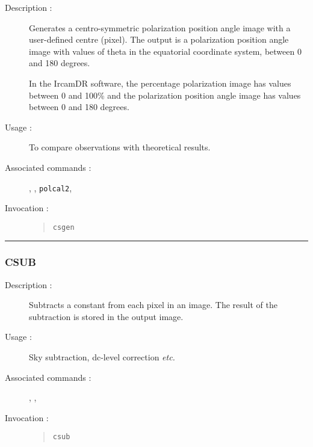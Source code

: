 \begin{description}

\item[Description :] Generates a centro-symmetric polarization position
angle image with a user-defined centre (pixel).  The output is a
polarization position angle image with values of theta in the
equatorial coordinate system, between 0 and 180 degrees.

In the {\sc IrcamDR} software, the percentage polarization image has
values between 0 and 100\% and the polarization position angle image
has values between 0 and 180 degrees.

\item[Usage :] To compare observations with theoretical results.

\item[Associated commands :] {\tt {}}, 
{\tt {}}, {\tt polcal2}, 
{\tt {}}

\item[Invocation :]

\begin{quote}{\tt  csgen }\end{quote}

\end{description}

\hrule 
\subsubsection*{\label{CSUB}CSUB}

\begin{description}

\item[Description :] Subtracts a constant from each pixel in an image.
The result of the subtraction is stored in the output image.

\item[Usage :] Sky subtraction, dc-level correction \emph{etc.}

\item[Associated commands :] {\tt {}}, 
{\tt {}}, {\tt {}}

\item[Invocation :]

\begin{quote}{\tt  csub }\end{quote}

\end{description}

